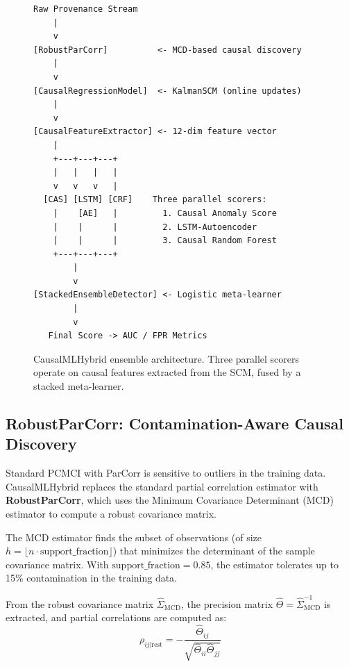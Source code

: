 \begin{figure}[htbp]
\centering
\begin{tcolorbox}[colback=gray!5, colframe=black!50, width=\linewidth, title=CausalMLHybrid Architecture]
\small
\begin{verbatim}
Raw Provenance Stream
    |
    v
[RobustParCorr]          <- MCD-based causal discovery
    |
    v
[CausalRegressionModel]  <- KalmanSCM (online updates)
    |
    v
[CausalFeatureExtractor] <- 12-dim feature vector
    |
    +---+---+---+
    |   |   |   |
    v   v   v   |
  [CAS] [LSTM] [CRF]    Three parallel scorers:
    |    [AE]   |         1. Causal Anomaly Score
    |    |      |         2. LSTM-Autoencoder
    |    |      |         3. Causal Random Forest
    +---+---+---+
        |
        v
[StackedEnsembleDetector] <- Logistic meta-learner
        |
        v
   Final Score -> AUC / FPR Metrics
\end{verbatim}
\end{tcolorbox}
\caption{CausalMLHybrid ensemble architecture. Three parallel scorers operate on causal features extracted from the SCM, fused by a stacked meta-learner.}
\label{fig:v2_arch}
\end{figure}

\subsection{RobustParCorr: Contamination-Aware Causal Discovery}

Standard PCMCI with ParCorr is sensitive to outliers in the training data. CausalMLHybrid replaces the standard partial correlation estimator with \textbf{RobustParCorr}, which uses the Minimum Covariance Determinant (MCD) estimator to compute a robust covariance matrix.

The MCD estimator finds the subset of observations (of size $h = \lfloor n \cdot \text{support\_fraction} \rfloor$) that minimizes the determinant of the sample covariance matrix. With $\text{support\_fraction} = 0.85$, the estimator tolerates up to 15\% contamination in the training data.

From the robust covariance matrix $\hat{\Sigma}_{\text{MCD}}$, the precision matrix $\hat{\Theta} = \hat{\Sigma}_{\text{MCD}}^{-1}$ is extracted, and partial correlations are computed as:
\begin{equation}
\rho_{ij|\text{rest}} = -\frac{\hat{\Theta}_{ij}}{\sqrt{\hat{\Theta}_{ii} \hat{\Theta}_{jj}}}
\end{equation}

